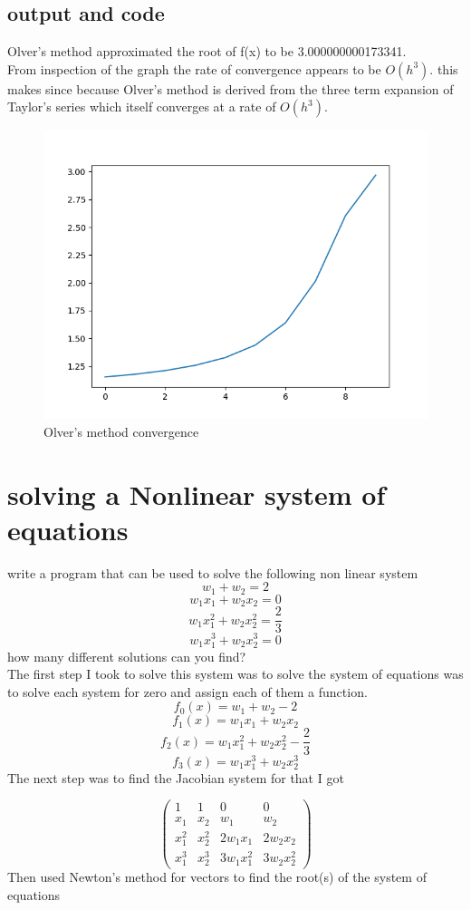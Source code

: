 \documentclass{article}
\begin{document}
\subsection*{output and code}
Olver's method approximated the root of f(x) to be 3.000000000173341.\\
From inspection of the graph the rate of convergence appears to be $O(h^3)$. this makes since because Olver's method is derived from the three term expansion of Taylor's series which itself converges at a rate of  $O(h^3)$.
	\begin{figure}[hbt!]
		\centering
		\includegraphics[width=.75\linewidth]{olvers_alpha.png}
		\caption{Olver's method convergence}
		\label{fig: Olver's method convergence}
	\end{figure} 
\pagebreak
\section{solving a Nonlinear system of equations}
write a program that can be used to solve the following non linear system
$$w_1 + w_2 = 2$$
$$w_1x_1 + w_2x_2 = 0$$
$$w_1x_1^2 + w_2x_2^2 = \frac{2}{3}$$
$$w_1x_1^3 + w_2x_2^3 = 0$$
how many different solutions can you find?\\
The first step I took to solve this system was to solve the system of equations was to solve each system for zero and assign each of them a function. 
$$f_0(x) = w_1 + w_2 - 2  $$
$$f_1(x) = w_1x_1 + w_2x_2 $$
$$f_2(x) = w_1x_1^2 + w_2x_2^2 - \frac{2}{3}  $$
$$f_3(x) = w_1x_1^3 + w_2x_2^3 $$
The next step was to find the Jacobian system for that I got

\renewcommand{\arraystretch}{1.5}  %

$$\begin{pmatrix}
	1 & 1 & 0 & 0 \\
	x_1 & x_2 & w_1 & w_2 \\
	x_1^2 & x_2^2 & 2w_1 x_1 & 2w_2 x_2 \\
	x_1^3 & x_2^3 & 3w_1 x_1^2 & 3w_2 x_2^2
\end{pmatrix}$$
Then used Newton's method for vectors to find the root(s) of the system of equations
\end{document}
